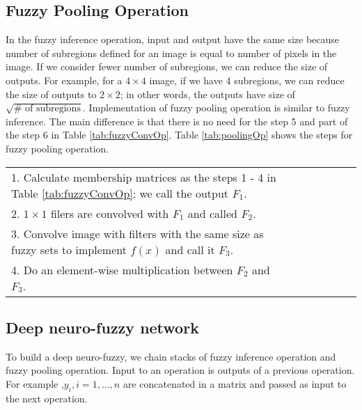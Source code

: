 \documentclass{article}
\begin{document}
\subsection{Fuzzy Pooling Operation}

In the fuzzy inference operation, input and output have the same size because number of subregions defined for an image is equal to number of pixels in the image. If we consider fewer number of subregions, we can reduce the size of outputs. For example, for a $4 \times 4$ image, if we have 4 subregions, we can reduce the size of outputs to $2 \times 2$; in other words, the outputs have size of  $\sqrt{\#\textrm{ of subregions}}$. Implementation of fuzzy pooling operation is similar to fuzzy inference. The main difference is that there is no need for the step 5 and part of the step 6 in Table \ref{tab:fuzzyConvOp}. Table \ref{tab:poolingOp} shows the steps for fuzzy pooling operation.

\begin{table*}[tb]
\caption{Steps for fuzzy Pooling operation}
\label{tab:poolingOp}
\vskip 0.15in
\begin{center}
\begin{small}
\begin{tabular}{lcccccr}
\toprule
1. Calculate membership matrices as the steps 1 - 4 in Table \ref{tab:fuzzyConvOp}; we call the output $F_1$. \\
2. $1\times 1$ filers are convolved with $F_1$ and called $F_2$. \\
3. Convolve image with filters with the same size as fuzzy sets to implement $f(x)$ and call it $F_3$. \\
4. Do an element-wise multiplication between $F_2$ and $F_3$. \\
\bottomrule
\end{tabular}
\end{small}
\end{center}
\vskip -0.1in
\end{table*}

\subsection{Deep neuro-fuzzy network}

To build a deep neuro-fuzzy, we chain stacks of fuzzy inference operation and fuzzy pooling operation. Input to an operation is outputs of a previous operation. For example ,$y_i,   i=1,…,n$ are concatenated in a matrix and passed as input to the next operation.
\end{document}
